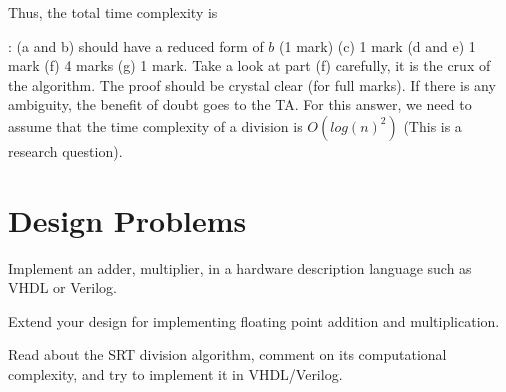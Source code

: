 \begin{ExerciseList}
\begin{enumerate}
Thus, the total time complexity is 
\end{enumerate}

 : (a and b) should have a reduced form of $b$  (1 mark) (c) 1 mark
(d and e) 1 mark (f) 4 marks (g) 1 mark. Take a look at part (f) carefully, it is the crux of the algorithm.
The proof should be crystal clear (for full marks). If there is any ambiguity, the benefit of doubt goes to the TA.
For this answer, we need to assume that the time complexity of a division is $O(log(n)^2)$ (This is a research
question). 

\end{ExerciseList}

\section*{Design Problems}
\begin{ExerciseList}

\Exercise
Implement an adder, multiplier, in a hardware description language such as VHDL or Verilog.

\Exercise
Extend your design for implementing floating point addition and multiplication.

\Exercise
Read about the SRT division algorithm, comment on its computational complexity, and try to implement it in
VHDL/Verilog.
\end{ExerciseList}










































